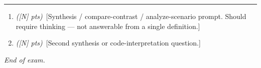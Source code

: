 \documentclass[11pt]{article}
\newif\ifanswers
\newcommand{\examsection}[1]{%
  \par\vspace{1.4em}%
  \noindent\rule{\linewidth}{0.3pt}\par\vspace{2pt}%
  \noindent{\textsc{\large #1}}%
  \par\vspace{0.4em}}
\newcounter{wl}
\newcommand{\writelines}[1]{%
  \par\vspace{0.4em}%
  \setcounter{wl}{0}%
  \loop\ifnum\value{wl}<#1%
    \noindent\rule[0.45em]{\linewidth}{0.3pt}\par\vspace{0.30in}%
    \stepcounter{wl}%
  \repeat}
\begin{document}
\examsection{Short Answer}
\begin{enumerate}[resume]

\item \needspace{2.5in} \textit{([N] pts)}~[Synthesis / compare-contrast / analyze-scenario prompt. Should require thinking — not answerable from a single definition.]
  \ifanswers \par\smallskip \textcolor{keyred}{\textit{Key:}} [Model answer usable as a grading rubric.]
  \par\smallskip \textsc{\footnotesize Coverage:}~{\footnotesize [lecture S#] $\cdot$ [textbook §] $\cdot$ [reading list reference]}
  \par\smallskip \textbf{Gradescope rubric} \textit{(additive, [N] pts):}
  \begin{itemize}[noitemsep, leftmargin=1.5em, topsep=2pt]
    \item \textbf{\textcolor{keygreen}{+[N]}} \quad [criterion satisfied] \textit{([rubric-category])}
    \item \textbf{\textcolor{keygrey}{+0}} \quad [criterion not met] \textit{([rubric-category])}
    \item \textbf{\textcolor{keygrey}{+0}} \quad Blank / off-topic \textit{(catchall)}
  \end{itemize}
  \else {} \fi

\item \needspace{2.5in} \textit{([N] pts)}~[Second synthesis or code-interpretation question.]
  \ifanswers \par\smallskip \textcolor{keyred}{\textit{Key:}} [Model answer.]
  \par\smallskip \textsc{\footnotesize Coverage:}~{\footnotesize [lecture S#] $\cdot$ [textbook §] $\cdot$ [reading list reference]}
  \par\smallskip \textbf{Gradescope rubric} \textit{(additive, [N] pts):}
  \begin{itemize}[noitemsep, leftmargin=1.5em, topsep=2pt]
    \item \textbf{\textcolor{keygreen}{+[N]}} \quad [criterion] \textit{([rubric-category])}
    \item \textbf{\textcolor{keygrey}{+0}} \quad Blank / off-topic \textit{(catchall)}
  \end{itemize}
  \else {} \fi

\end{enumerate}

\par\vfill
\begin{center}\small\textit{End of exam.}\end{center}
\end{document}
